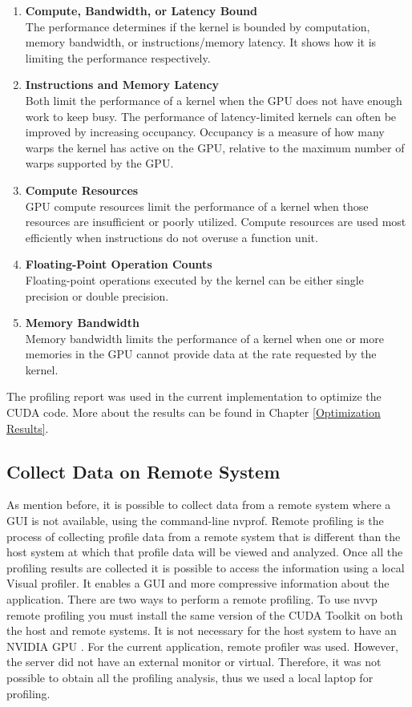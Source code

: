 \begin{enumerate}
  \item \textbf{Compute, Bandwidth, or Latency Bound} \hfill \\
      The performance determines if the kernel is bounded by computation, memory bandwidth, or instructions/memory latency. It shows how it is limiting the performance respectively.
  
  \item \textbf{Instructions and Memory Latency} \hfill \\
Both limit the performance of a kernel when the GPU does not have enough work to keep busy. The performance of latency-limited kernels can often be improved by increasing occupancy. Occupancy is a measure of how many warps the kernel has active on the GPU, relative to the maximum number of warps supported by the GPU.
  
  \item \textbf{Compute Resources} \hfill \\
GPU compute resources limit the performance of a kernel when those resources are insufficient or poorly utilized. Compute resources are used most efficiently when instructions do not overuse a function unit. 
  \item \textbf{Floating-Point Operation Counts} \hfill \\
  Floating-point operations executed by the kernel can be either single precision or double precision.
  
  \item \textbf{Memory Bandwidth} \hfill \\
  Memory bandwidth limits the performance of a kernel when one or more memories in the GPU cannot provide data at the rate requested by the kernel.
\end{enumerate}

The profiling report was used in the current implementation to optimize the CUDA code. More about the results can be found in Chapter \ref{Optimization Results}.

\subsection{Collect Data on Remote System}

As mention before, it is possible to collect data from a remote system where a GUI is not available, using the command-line nvprof. Remote profiling is the process of collecting profile data from a remote system that is different than the host system at which that profile data will be viewed and analyzed. Once all the profiling results are collected it is possible to access the information using a local Visual profiler. It enables a GUI and more compressive information about the application. There are two ways to perform a remote profiling. To use nvvp remote profiling you must install the same version of the CUDA Toolkit on both the host and remote systems. It is not necessary for the host system to have an NVIDIA GPU \cite{tool}. For the current application, remote profiler was used. However, the server did not have an external monitor or virtual. Therefore, it was not possible to obtain all the profiling analysis, thus we used a local laptop for profiling.

